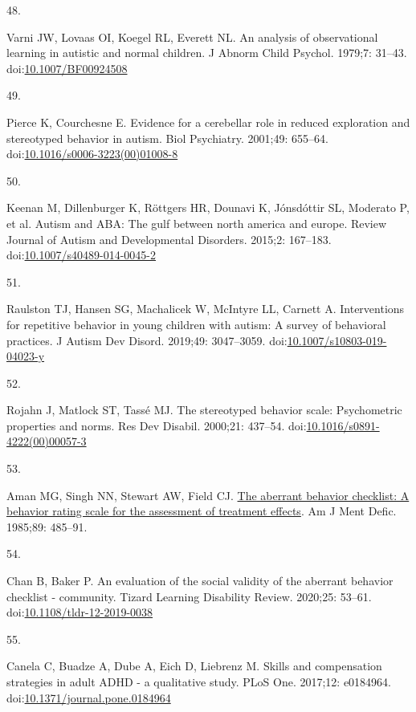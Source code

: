 \documentclass[
  letterpaper,
  DIV=11,
  numbers=noendperiod]{scrartcl}
\newlength{\cslhangindent}
\newlength{\csllabelwidth}
\newenvironment{CSLReferences}[2] %
 {\begin{list}{}{%
  \setlength{\itemindent}{0pt}
  \setlength{\leftmargin}{0pt}
  \setlength{\parsep}{0pt}
  \ifodd #1
   \setlength{\leftmargin}{\cslhangindent}
   \setlength{\itemindent}{-1\cslhangindent}
  \fi
  \setlength{\itemsep}{#2\baselineskip}}}
 {\end{list}}
\newcommand{\CSLLeftMargin}[1]{\parbox[t]{\csllabelwidth}{\strut#1\strut}}
\newcommand{\CSLRightInline}[1]{\parbox[t]{\linewidth - \csllabelwidth}{\strut#1\strut}}
\begin{document}
\begin{CSLReferences}{0}{1}
\CSLLeftMargin{48. }%
\CSLRightInline{Varni JW, Lovaas OI, Koegel RL, Everett NL. An analysis
of observational learning in autistic and normal children. J Abnorm
Child Psychol. 1979;7: 31--43.
doi:\href{https://doi.org/10.1007/BF00924508}{10.1007/BF00924508}}

\CSLLeftMargin{49. }%
\CSLRightInline{Pierce K, Courchesne E. Evidence for a cerebellar role
in reduced exploration and stereotyped behavior in autism. Biol
Psychiatry. 2001;49: 655--64.
doi:\href{https://doi.org/10.1016/s0006-3223(00)01008-8}{10.1016/s0006-3223(00)01008-8}}

\CSLLeftMargin{50. }%
\CSLRightInline{Keenan M, Dillenburger K, Röttgers HR, Dounavi K,
Jónsdóttir SL, Moderato P, et al. Autism and ABA: The gulf between north
america and europe. Review Journal of Autism and Developmental
Disorders. 2015;2: 167--183.
doi:\href{https://doi.org/10.1007/s40489-014-0045-2}{10.1007/s40489-014-0045-2}}

\CSLLeftMargin{51. }%
\CSLRightInline{Raulston TJ, Hansen SG, Machalicek W, McIntyre LL,
Carnett A. Interventions for repetitive behavior in young children with
autism: A survey of behavioral practices. J Autism Dev Disord. 2019;49:
3047--3059.
doi:\href{https://doi.org/10.1007/s10803-019-04023-y}{10.1007/s10803-019-04023-y}}

\CSLLeftMargin{52. }%
\CSLRightInline{Rojahn J, Matlock ST, Tassé MJ. The stereotyped behavior
scale: Psychometric properties and norms. Res Dev Disabil. 2000;21:
437--54.
doi:\href{https://doi.org/10.1016/s0891-4222(00)00057-3}{10.1016/s0891-4222(00)00057-3}}

\CSLLeftMargin{53. }%
\CSLRightInline{Aman MG, Singh NN, Stewart AW, Field CJ.
\href{https://www.ncbi.nlm.nih.gov/pubmed/3993694}{The aberrant behavior
checklist: A behavior rating scale for the assessment of treatment
effects}. Am J Ment Defic. 1985;89: 485--91. }

\CSLLeftMargin{54. }%
\CSLRightInline{Chan B, Baker P. An evaluation of the social validity of
the aberrant behavior checklist - community. Tizard Learning Disability
Review. 2020;25: 53--61.
doi:\href{https://doi.org/10.1108/tldr-12-2019-0038}{10.1108/tldr-12-2019-0038}}

\CSLLeftMargin{55. }%
\CSLRightInline{Canela C, Buadze A, Dube A, Eich D, Liebrenz M. Skills
and compensation strategies in adult ADHD - a qualitative study. PLoS
One. 2017;12: e0184964.
doi:\href{https://doi.org/10.1371/journal.pone.0184964}{10.1371/journal.pone.0184964}}


\end{CSLReferences}
\end{document}
